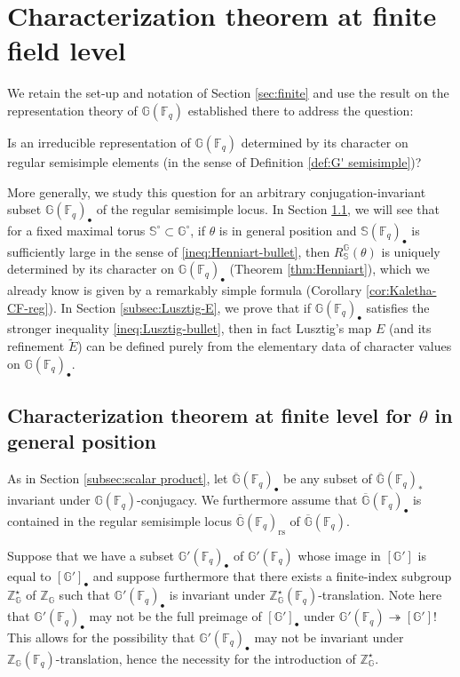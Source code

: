 \documentclass{amsart}
\newcommand{\rs}{\mathrm{rs}}
\newcommand{\F}{\mathbb{F}}
\newcommand{\FF}{\mathbb{F}}
\newcommand{\bbF}{\mathbb{F}}
\newcommand{\bbS}{\mathbb{S}}
\newcommand{\bbG}{\mathbb{G}}
\newcommand{\bbZ}{\mathbb{Z}}
\theoremstyle{plain}
\theoremstyle{definition}
\theoremstyle{remark}
\theoremstyle{theorem}
\begin{document}
\section{Characterization theorem at finite field level}\label{sec:char finite}

We retain the set-up and notation of Section \ref{sec:finite} and use the result on the representation theory of $\bbG(\FF_q)$ established there to address the question:
\begin{center}
    Is an irreducible representation of $\bbG(\FF_q)$ determined by its character on \\ regular semisimple elements (in the sense of Definition \ref{def:G' semisimple})? 
\end{center}
More generally, we study this question for an arbitrary conjugation-invariant subset $\bbG(\FF_q)_\bullet$ of the regular semisimple locus. In Section \ref{subsec:char-finite-gen-pos}, we will see that for a fixed maximal torus $\bbS^\circ \subset \bbG^\circ$, if $\theta$ is in general position and $\bbS(\FF_q)_\bullet$ is sufficiently large in the sense of \eqref{ineq:Henniart-bullet}, then $R_\bbS^\bbG(\theta)$ is uniquely determined by its character on $\bbG(\FF_q)_\bullet$ (Theorem \ref{thm:Henniart}), which we already know is given by a remarkably simple formula (Corollary \ref{cor:Kaletha-CF-reg}). In Section \ref{subsec:Lusztig-E}, we prove that if $\bbG(\FF_q)_\bullet$ satisfies the stronger inequality \eqref{ineq:Lusztig-bullet}, then in fact Lusztig's map $E$ (and its refinement $\tilde E$) can be defined purely from the elementary data of character values on $\bbG(\FF_q)_\bullet$.



\subsection{Characterization theorem at finite level for $\theta$ in general position}\label{subsec:char-finite-gen-pos}

As in Section \ref{subsec:scalar product}, let $\overline{\bbG}(\FF_q)_{\bullet}$ be any subset of $\overline{\bbG}(\F_{q})_{\ast}$ invariant under $\bbG(\FF_q)$-conjugacy. 
We furthermore assume that $\overline{\bbG}(\FF_q)_{\bullet}$ is contained in the regular semisimple locus $\overline{\bbG}(\FF_q)_{\rs}$ of $\overline{\bbG}(\FF_q)$.

Suppose that we have a subset $\bbG'(\F_{q})_{\bullet}$ of $\bbG'(\F_{q})$ whose image in $[\bbG']$ is equal to $[\bbG']_{\bullet}$ and suppose furthermore that there exists a finite-index subgroup $\bbZ_\bbG^\star$ of $\bbZ_\bbG$ such that $\bbG'(\bbF_q)_\bullet$ is invariant under $\bbZ_\bbG^\star(\FF_q)$-translation.
Note here that $\bbG'(\FF_q)_{\bullet}$ may not be the full preimage of $[\bbG']_\bullet$ under $\bbG'(\FF_q) \twoheadrightarrow [\bbG']$! This allows for the possibility that $\bbG'(\FF_q)_\bullet$ may not be invariant under $\bbZ_\bbG(\FF_q)$-translation, hence the necessity for the introduction of $\bbZ_\bbG^\star$.
\end{document}
